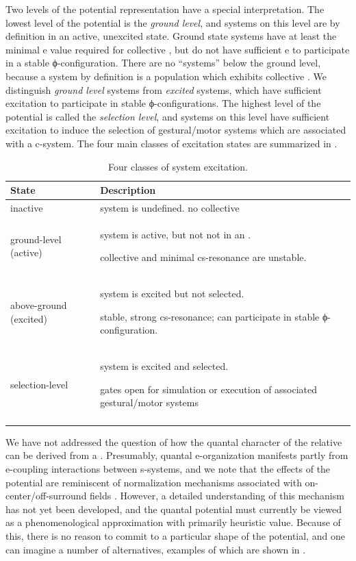   Two levels of the potential representation have a special  interpretation. The lowest level of the potential is the \textit{ground level}, and systems on this level are by definition in an active, unexcited state. Ground state systems have at least the minimal e value required for collective , but do not have sufficient e to participate in a stable ϕ-configuration. There are no “systems” below the ground level, because a system by definition is a population which exhibits collective . We distinguish \textit{ground level} systems from \textit{excited} systems, which have sufficient excitation to participate in stable ϕ-configurations. The highest level of the potential is called the \textit{selection level}, and systems on this level have sufficient excitation to induce the selection of gestural/motor systems which are associated with a c-system. The four main classes of excitation states are summarized in {}.

\begin{table}
\begin{tabularx}{\textwidth}{lQ}
\lsptoprule
State & Description\\
\midrule 
inactive & system is undefined. no collective \\
ground-level (active) & system is active, but not not in an .

collective  and minimal cs-resonance are unstable.\\
above-ground (excited) & system is excited but not selected.

stable, strong cs-resonance; can participate in stable ϕ-configuration.\\
selection-level & system is excited and selected.

gates open for simulation or execution of associated gestural/motor systems\\
\lspbottomrule
\end{tabularx}
\caption{Four classes of system excitation.}\label{tab:1:2}
\end{table}
 
 We have not addressed the question of how the quantal character of the relative  can be derived from a . Presumably, quantal e-organization manifests partly from e-coupling interactions between s-systems, and we note that the effects of the potential are reminiscent of normalization mechanisms associated with on-center/off-surround fields \citep{Grossberg1978,Grossberg1987}. However, a detailed understanding of this mechanism has not yet been developed, and the quantal potential must currently be viewed as a phenomenological approximation with primarily heuristic value. Because of this, there is no reason to commit to a particular shape of the potential, and one can imagine a number of alternatives, examples of which are shown in {}.

